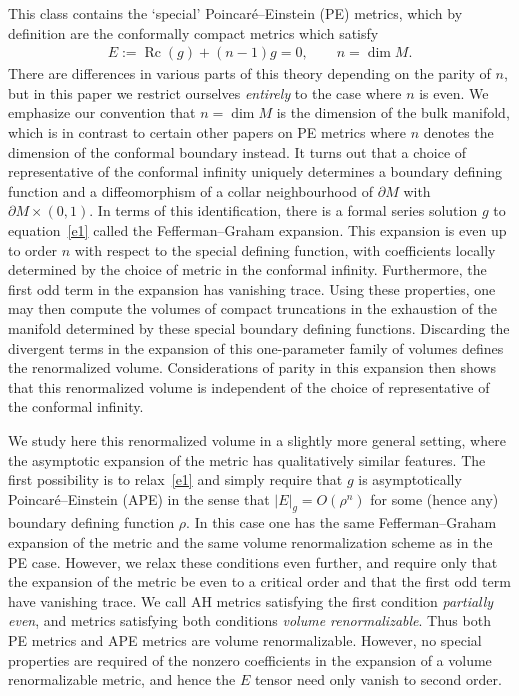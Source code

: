 \documentclass[11pt]{article}
\numberwithin{equation}{section}
\DeclareMathOperator{\Rc}{Rc}
\begin{document}
This class contains the `special' Poincar\'e--Einstein (PE) metrics, which by definition are the conformally compact metrics which satisfy
\begin{gather} \label{e1}
E := \Rc(g) + (n-1)g = 0,\qquad n = \dim M.
\end{gather}
There are differences in various parts of this theory depending on the parity of $n$, but in this paper we restrict ourselves
{\it entirely} to the case where $n$ is even. We emphasize our convention that $n = \dim M$ is the dimension of the bulk manifold,
which is in contrast to certain other papers on PE metrics where $n$ denotes the dimension of the conformal boundary instead.
It turns out that a choice of representative of the conformal infinity uniquely determines a boundary defining function and
a diffeomorphism of a collar neighbourhood of $\partial M$ with $\partial M \times (0,1)$. In terms of this identification,
there is a formal series solution $g$ to equation~\eqref{e1} called the Fefferman--Graham expansion. This expansion is
even up to order $n$ with respect to the special defining function, with coefficients locally determined by the choice of metric
in the conformal infinity. Furthermore, the first odd term in the expansion has vanishing trace. Using these properties,
one may then compute the volumes of compact truncations in the exhaustion of the manifold determined by these special
boundary defining functions. Discarding the divergent terms in the expansion of this one-parameter family of volumes
defines the renormalized volume. Considerations of parity in this expansion then shows that this renormalized volume
is independent of the choice of representative of the conformal infinity.

We study here this renormalized volume in a slightly more general setting, where the asymptotic expansion of the metric
has qualitatively similar features. The first possibility is to relax~\eqref{e1} and simply require that $g$ is asymptotically
Poincar\'e--Einstein (APE) in the sense that $|E|_g = O(\rho^n)$ for some (hence any) boundary defining function $\rho$. In
this case one has the same Fefferman--Graham expansion of the metric and the same volume renormalization scheme as
in the PE case. However, we relax these conditions even further, and require only that the expansion of the metric be even
to a critical order and that the first odd term have vanishing trace. We call AH metrics satisfying the first condition {\it
partially even}, and metrics satisfying both conditions {\it volume renormalizable}. Thus both PE metrics and APE metrics are
volume renormalizable. However, no special properties are required of the nonzero coefficients in the expansion of
a volume renormalizable metric, and hence the $E$ tensor need only vanish to second order.
\end{document}
